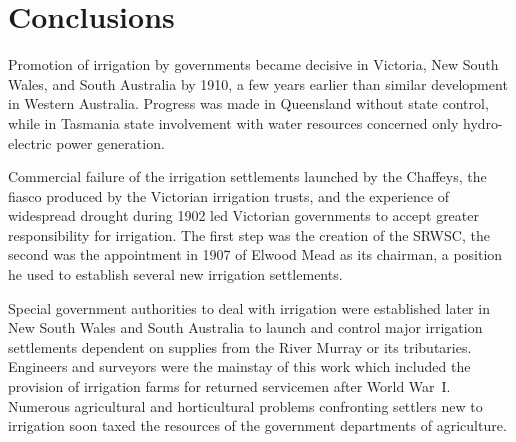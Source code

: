 \section*{Conclusions}

Promotion of irrigation by governments became decisive in Victoria,
New South Wales, and South Australia by 1910, a few years earlier than
similar development in Western Australia.  Progress was made in
Queensland without state control, while in Tasmania state involvement
with water resources concerned only hydro-electric power generation.

Commercial failure of the irrigation settlements launched by the
Chaffeys, the fiasco produced by the Victorian irrigation trusts, and
the experience of widespread drought during 1902 led Victorian
governments to accept greater responsibility for irrigation.  The
first step was the creation of the SRWSC, the second was the
appointment in 1907 of Elwood Mead as its chairman, a position he used
to establish several new irrigation settlements.

Special government authorities to deal with irrigation were
established later in New South Wales and South Australia to launch and
control major irrigation settlements dependent on supplies from the
River Murray or its tributaries.  Engineers and surveyors were the
mainstay of this work which included the provision of irrigation farms
for returned servicemen after World War~I.  Numerous agricultural and
horticultural problems confronting settlers new to irrigation soon
taxed the resources of the government departments of agriculture.

